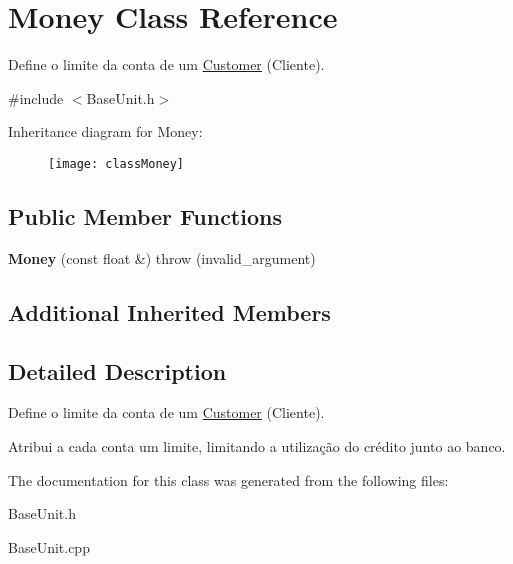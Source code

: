 \hypertarget{classMoney}{\section{Money Class Reference}
\label{classMoney}
}


Define o limite da conta de um \hyperlink{classCustomer}{Customer} (Cliente).  




{\ttfamily \#include $<$Base\-Unit.\-h$>$}

Inheritance diagram for Money\-:\begin{figure}[H]
\begin{center}
\leavevmode
\texttt{[image: classMoney]}
\end{center}
\end{figure}
\subsection*{Public Member Functions}
\begin{DoxyCompactItemize}
\item 
\hypertarget{classMoney_a33986736e7432883ebd61584815b6681}{{\bfseries Money} (const float \&)  throw (invalid\-\_\-argument)}\label{classMoney_a33986736e7432883ebd61584815b6681}

\end{DoxyCompactItemize}
\subsection*{Additional Inherited Members}


\subsection{Detailed Description}
Define o limite da conta de um \hyperlink{classCustomer}{Customer} (Cliente). 

Atribui a cada conta um limite, limitando a utilização do crédito junto ao banco. 

The documentation for this class was generated from the following files\-:\begin{DoxyCompactItemize}
\item 
Base\-Unit.\-h\item 
Base\-Unit.\-cpp\end{DoxyCompactItemize}
